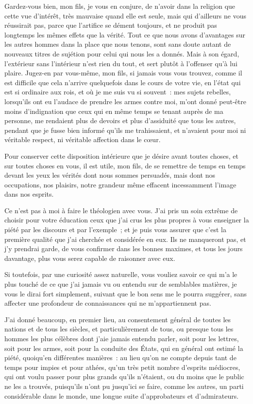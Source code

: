 \documentclass[french,twoside]{book} %
\begin{document}
Gardez-vous bien, mon fils, je vous en conjure, de n’avoir dans la religion que cette vue d’intérêt, très mauvaise quand elle est seule, mais qui d’ailleurs ne vous réussirait pas, parce que l’artifice se dément toujours, et ne produit pas longtemps les mêmes effets que la vérité. Tout ce que nous avons d’avantages sur les autres hommes dans la place que nous tenons, sont sans doute autant de nouveaux titres de sujétion pour celui qui nous les a donnés. Mais à son égard, l’extérieur sans l’intérieur n’est rien du tout, et sert plutôt à l’offenser qu’à lui plaire. Jugez-en par vous-même, mon fils, si jamais vous vous trouvez, comme il est difficile que cela n’arrive quelquefois dans le cours de votre vie, en l’état qui est si ordinaire aux rois, et où je me suis vu si souvent : mes sujets rebelles, lorsqu’ils ont eu l’audace de prendre les armes contre moi, m’ont donné peut-être moins d’indignation que ceux qui en même temps se tenant auprès de ma personne, me rendaient plus de devoirs et plus d’assiduité que tous les autres, pendant que je fusse bien informé qu’ils me trahissaient, et n’avaient pour moi ni véritable respect, ni véritable affection dans le cœur.\par
Pour conserver cette disposition intérieure que je désire avant toutes choses, et sur toutes choses en vous, il est utile, mon fils, de se remettre de temps en temps devant les yeux les vérités dont nous sommes persuadés, mais dont nos occupations, nos plaisirs, notre grandeur même effacent incessamment l’image dans nos esprits.\par
Ce n’est pas à moi à faire le théologien avec vous. J’ai pris un soin extrême de choisir pour votre éducation ceux que j’ai crus les plus propres à vous enseigner la piété par les discours et par l’exemple ; et je puis vous assurer que c’est la première qualité que j’ai cherchée et considérée en eux. Ils ne manqueront pas, et j’y prendrai garde, de vous confirmer dans les bonnes maximes, et tous les jours davantage, plus vous serez capable de raisonner avec eux.\par
Si toutefois, par une curiosité assez naturelle, vous vouliez savoir ce qui m’a le plus touché de ce que j’ai jamais vu ou entendu sur de semblables matières, je vous le dirai fort simplement, suivant que le bon sens me le pourra suggérer, sans affecter une profondeur de connaissances qui ne m’appartiennent pas.\par
J’ai donné beaucoup, en premier lieu, au consentement général de toutes les nations et de tous les siècles, et particulièrement de tous, ou presque tous les hommes les plus célèbres dont j’aie jamais entendu parler, soit pour les lettres, soit pour les armes, soit pour la conduite des États, qui en général ont estimé la piété, quoiqu’en différentes manières : au lieu qu’on ne compte depuis tant de temps pour impies et pour athées, qu’un très petit nombre d’esprits médiocres, qui ont voulu passer pour plus grands qu’ils n’étaient, ou du moins que le public ne les a trouvés, puisqu’ils n’ont pu jusqu’ici se faire, comme les autres, un parti considérable dans le monde, une longue suite d’approbateurs et d’admirateurs.\par
\end{document}
